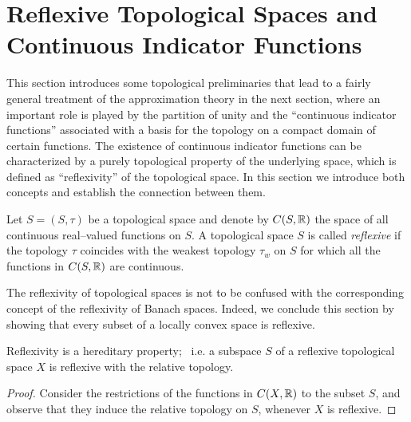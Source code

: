 \bigskip

\goodbreak

\def\baselinestretch{1.1}

\section{Reflexive Topological Spaces and Continuous Indicator Functions}

This section introduces some topological preliminaries that
lead to a fairly general treatment of the approximation theory
in the next section, where an important role is played by the
partition of unity and the ``continuous indicator functions''
associated with a basis for the topology on a compact domain of
certain functions. The existence of continuous indicator
functions can be characterized by a purely topological property
of the underlying space, which is defined as ``reflexivity'' of
the topological space. In this section we introduce both
concepts and establish the connection between them.

\def\baselinestretch{1.66}

\bigskip
\goodbreak
\newpage

\begin{defn}
Let $S=(S,\tau)$ be a topological space and denote by
$C(S,\mathbb R)$ the space of all continuous real--valued functions
on $S$. A topological space $S$ is called {\em reflexive} if
the topology $\tau$ coincides with the weakest topology
$\tau_w$ on $S$ for which all the functions in $C(S,\mathbb R)$ are
continuous.
\end{defn}

\begin{rem}
The reflexivity of topological spaces is not to be confused
with the corresponding concept of the reflexivity of Banach
spaces. Indeed, we conclude this section by showing that every
subset of a locally convex space is reflexive.
\end{rem}

\begin{prop}
Reflexivity is a hereditary property; \, i.e. a subspace $S$ of
a reflexive topological space $X$ is reflexive with the
relative topology.
\end{prop}

\begin{proof}
Consider the restrictions of the functions in $C(X,\mathbb R)$ to
the subset $S$, and observe that they induce the relative
topology on $S$, whenever $X$ is reflexive.
\end{proof}

